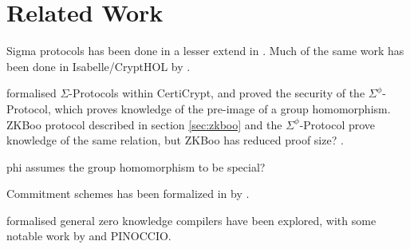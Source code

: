 \chapter{Related Work}
\label{ch:related_work}

Sigma protocols has been done in a lesser extend in \easycrypt. Much of the same
work has been done in Isabelle/CryptHOL by \citeauthor{cryptoeprint:2019:1185}.

\citeauthor{certicrypt_sigma} formalised $\Sigma$-Protocols within CertiCrypt,
and proved the security of the $\Sigma^{\phi}$-Protocol, which proves knowledge
of the pre-image of a group homomorphism. ZKBoo protocol described in section
\ref{sec:zkboo} and the $\Sigma^{\phi}$-Protocol prove knowledge of the same
relation, but ZKBoo has reduced proof size? .

phi assumes the group homomorphism to be special?


Commitment schemes has been formalized in \easycrypt by
\citeauthor{DBLP:journals/corr/MetereD17}.


formalised general zero knowledge compilers have been explored, with some
notable work by \citeauthor{zkcrypt} and PINOCCIO.



